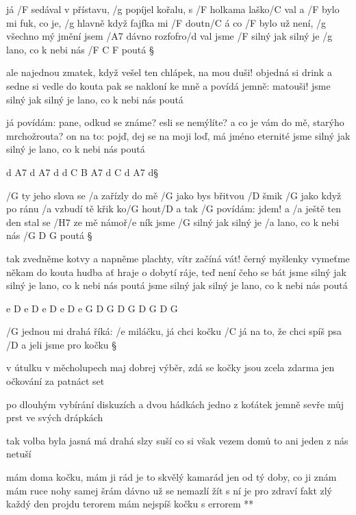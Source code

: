 





já /F sedával v přístavu, /g popíjel kořalu, s /F holkama laško/C val
a /F bylo mi fuk, co je, /g hlavně když fajfka mi /F doutn/C á
co /F bylo už není, /g všechno mý jmění jsem /A7 dávno rozfofro/d val
jsme /F silný jak silný je /g lano, co k nebi nás /{F C F} poutá \S

ale najednou zmatek, když vešel ten chlápek, na mou duši!
objedná si drink a sedne si vedle do kouta
pak se nakloní ke mně a povídá jemně: matouši!
jsme silný jak silný je lano, co k nebi nás poutá \s

já povídám: pane, odkud se známe? esli se nemýlíte?
a co je vám do mě, starýho mrchožrouta?
on na to: pojď, dej se na moji loď, má jméno eternité
jsme silný jak silný je lano, co k nebi nás poutá \s

d A7 d A7 d
d C B A7 d C d A7 d\S

/G ty jeho slova se /a zařízly do mě /G jako bys břitvou /D šmik
/G jako když po ránu /a vzbudí tě křik ko/G hout/D a
tak /G povídám: jdem! a /a ještě ten den stal se /H7 ze mě námoř/e ník
jsme /G silný jak silný je /a lano, co k nebi nás /{G D G} poutá \S

tak zvedněme kotvy a napněme plachty, vítr začíná vát!
černý myšlenky vymeťme někam do kouta
hudba ať hraje o dobytí ráje, teď není čeho se bát
jsme silný jak silný je lano, co k nebi nás poutá
jsme silný jak silný je lano, co k nebi nás poutá \s

e D e D e D e D e
G D G D G D G D G



/G jednou mi drahá říká: /e miláčku, já chci kočku
/C já na to, že chci spíš psa /D a jeli jsme pro kočku \S

v útulku v měcholupech maj dobrej výběr, zdá se
kočky jsou zcela zdarma jen očkování za patnáct set \s

po dlouhým vybírání diskuzích a dvou hádkách
jedno z koťátek jemně sevře můj prst ve svých drápkách \s

tak volba byla jasná má drahá slzy suší
co si však vezem domů to ani jeden z nás netuší

\R mám doma kočku, mám ji rád je to skvělý kamarád
   jen od tý doby, co ji znám mám ruce nohy samej šrám
   dávno už se nemazlí žít s ní je pro zdraví fakt zlý
   každý den projdu terorem mám nejspíš kočku s errorem **

